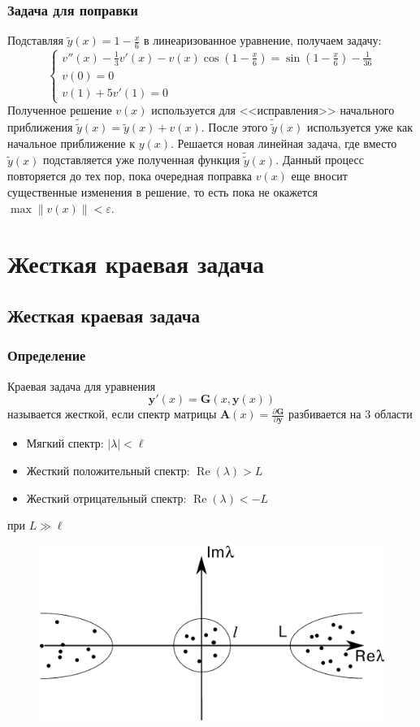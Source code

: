 \documentclass[professionalfonts,compress,unicode,aspectratio=169]{beamer}
\begin{document}
\begin{frame}\frametitle{Задача для поправки}
	Подставляя $\tilde{y}(x) = 1 - \frac{x}{6}$ в линеаризованное уравнение, получаем задачу:
	\[\begin{cases}
	v''(x) - \frac{1}{3} v'(x) - v(x) \cos \left(1 - \frac{x}{6}\right) =
	 \sin \left(1 - \frac{x}{6}\right) - \frac{1}{36}\\
	v(0) = 0\\
	v(1) + 5v'(1) = 0
	\end{cases}\]
	Полученное решение $v(x)$ используется для <<исправления>> начального
	приближения $\tilde{\tilde{y}}(x) = \tilde{y}(x) + v(x)$. После этого
	$\tilde{\tilde{y}}(x)$ используется уже как начальное приближение к $y(x)$.
	Решается новая линейная задача, где вместо $\tilde{y}(x)$ подставляется уже
	полученная функция $\tilde{\tilde{y}}(x)$. Данный процесс повторяется до тех
	пор, пока очередная поправка $v(x)$ еще вносит существенные изменения в
	решение, то есть пока не окажется $\max \|v(x)\| < \varepsilon$.
\end{frame}

\section{Жесткая краевая задача}
\subsection{Жесткая краевая задача}
\begin{frame}\frametitle{Определение}
	Краевая задача для уравнения
	\[\mathbf{y}'(x) = \mathbf{G}(x, \mathbf{y}(x))\]
	называется жесткой, если спектр матрицы $\mathbf{A}(x) = \frac{\partial
	\mathbf{G}}{\partial \mathbf{y}}$ разбивается на $3$ области
	\begin{itemize}
		\item Мягкий спектр: $|\lambda| < \ell$\\
		\item Жесткий положительный спектр: $\operatorname{Re}(\lambda) > L$
		\item Жесткий отрицательный спектр: $\operatorname{Re}(\lambda) < -L$
	\end{itemize}
	при $L \gg \ell$
	\begin{figure}%
	\includegraphics[height=0.45\textheight]{stiff.pdf}%
	\end{figure}
\end{frame}
\end{document}
